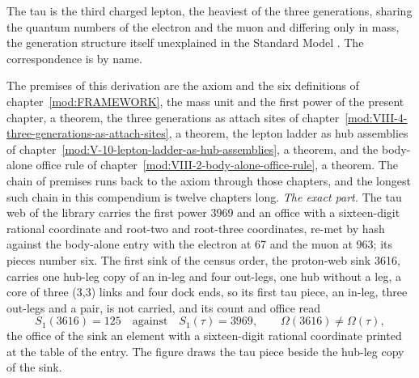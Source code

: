 \begin{chbridge}
The tau is the third charged lepton, the heaviest of the three generations, sharing the quantum numbers of the electron and the muon and differing only in mass, the generation structure itself unexplained in the Standard Model \cite{Perl1975,Weinberg1995}. The correspondence is by name.
\end{chbridge}
\begin{chproof}
The premises of this derivation are the axiom and the six definitions of chapter~\ref{mod:FRAMEWORK}, the mass unit and the first power of the present chapter, a theorem, the three generations as attach sites of chapter~\ref{mod:VIII-4-three-generations-as-attach-sites}, a theorem, the lepton ladder as hub assemblies of chapter~\ref{mod:V-10-lepton-ladder-as-hub-assemblies}, a theorem, and the body-alone office rule of chapter~\ref{mod:VIII-2-body-alone-office-rule}, a theorem. The chain of premises runs back to the axiom through those chapters, and the longest such chain in this compendium is twelve chapters long.
\textit{The exact part.} The tau web of the library carries the first power 3969 and an office with a sixteen-digit rational coordinate and root-two and root-three coordinates, re-met by hash against the body-alone entry with the electron at 67 and the muon at 963; its pieces number six. The first sink of the census order, the proton-web sink 3616, carries one hub-leg copy of an in-leg and four out-legs, one hub without a leg, a core of three (3,3) links and four dock ends, so its first tau piece, an in-leg, three out-legs and a pair, is not carried, and its count and office read
\begin{equation} S_{1}(3616) = 125 \quad\text{against}\quad S_{1}(\tau) = 3969, \qquad \Omega(3616) \neq \Omega(\tau), \end{equation}
the office of the sink an element with a sixteen-digit rational coordinate printed at the table of the entry. The figure draws the tau piece beside the hub-leg copy of the sink.

\end{chproof}
